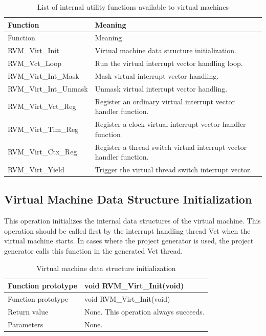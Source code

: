 \begin{xltabular}{\textwidth}{@{}>{\hsize\raggedright\arraybackslash}X>{\hsize\raggedright\arraybackslash}X@{}}
\caption{List of internal utility functions available to virtual machines}\label{tab:4-18}\\
\toprule
Function & Meaning\tabularnewline
\endfirsthead
\toprule
Function & Meaning\tabularnewline
\midrule
\endhead
\bottomrule
\endlastfoot
RVM\_\allowbreak{}Virt\_\allowbreak{}Init & Virtual machine data structure initialization.\tabularnewline
RVM\_\allowbreak{}Vct\_\allowbreak{}Loop & Run the virtual interrupt vector handling loop.\tabularnewline
RVM\_\allowbreak{}Virt\_\allowbreak{}Int\_\allowbreak{}Mask & Mask virtual interrupt vector handling.\tabularnewline
RVM\_\allowbreak{}Virt\_\allowbreak{}Int\_\allowbreak{}Unmask & Unmask virtual interrupt vector handling.\tabularnewline
RVM\_\allowbreak{}Virt\_\allowbreak{}Vct\_\allowbreak{}Reg & Register an ordinary virtual interrupt vector handler function.\tabularnewline
RVM\_\allowbreak{}Virt\_\allowbreak{}Tim\_\allowbreak{}Reg & Register a clock virtual interrupt vector handler function\tabularnewline
RVM\_\allowbreak{}Virt\_\allowbreak{}Ctx\_\allowbreak{}Reg & Register a thread switch virtual interrupt vector handler function.\tabularnewline
RVM\_\allowbreak{}Virt\_\allowbreak{}Yield & Trigger the virtual thread switch interrupt vector.\tabularnewline
\end{xltabular}

\subsection{Virtual Machine Data Structure Initialization}\label{subsec:4-5-1}

This operation initializes the internal data structures of the virtual machine. This operation should be called first by the interrupt handling thread Vct when the virtual machine starts. In cases where the project generator is used, the project generator calls this function in the generated Vct thread.

\begin{xltabular}{\textwidth}{@{}>{\hsize\raggedright\arraybackslash}X>{\hsize\raggedright\arraybackslash}X@{}}
\caption{Virtual machine data structure initialization}\label{tab:4-19}\\
\toprule
Function prototype & void RVM\_\allowbreak{}Virt\_\allowbreak{}Init(void)\tabularnewline
\endfirsthead
\toprule
Function prototype & void RVM\_\allowbreak{}Virt\_\allowbreak{}Init(void)\tabularnewline
\midrule
\endhead
\bottomrule
\endlastfoot
Return value & None. This operation always succeeds.\tabularnewline
Parameters & None.\tabularnewline
\end{xltabular}

